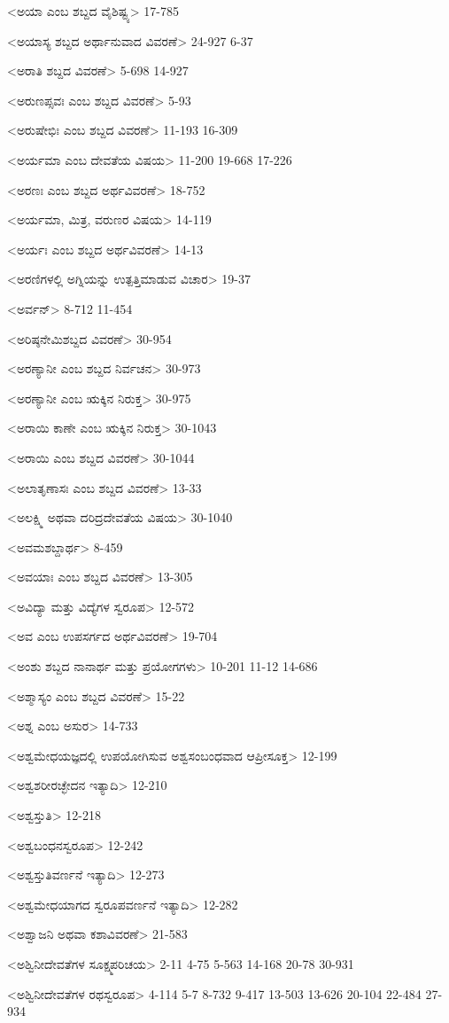 <ಅಯಾ ಎಂಬ ಶಬ್ದದ ವೈಶಿಷ್ಟ್ಯ>
17-785

<ಅಯಾಸ್ಯ ಶಬ್ದದ ಅರ್ಥಾನುವಾದ ವಿವರಣೆ>
24-927
6-37

<ಅರಾತಿ ಶಬ್ದದ ವಿವರಣೆ>
5-698
14-927

<ಅರುಣಪ್ಸವಃ ಎಂಬ ಶಬ್ದದ ವಿವರಣೆ>
5-93


<ಅರುಷೇಭಿಃ ಎಂಬ ಶಬ್ದದ ವಿವರಣೆ>
11-193
16-309

<ಅರ್ಯಮಾ ಎಂಬ ದೇವತೆಯ ವಿಷಯ>
11-200 
19-668
17-226

<ಅರಣಃ ಎಂಬ ಶಬ್ದದ ಅರ್ಥವಿವರಣೆ>
18-752

<ಅರ್ಯಮಾ, ಮಿತ್ರ, ವರುಣರ ವಿಷಯ>
14-119

<ಅರ್ಯಃ ಎಂಬ ಶಬ್ದದ ಅರ್ಥವಿವರಣೆ>
14-13

<ಅರಣಿಗಳಲ್ಲಿ ಅಗ್ನಿಯನ್ನು ಉತ್ಪತ್ತಿಮಾಡುವ ವಿಚಾರ>
19-37

<ಅರ್ವನ್‍>
8-712
11-454

<ಅರಿಷ್ಠನೇಮಿಶಬ್ದದ ವಿವರಣೆ>
30-954

<ಅರಣ್ಯಾನೀ ಎಂಬ ಶಬ್ದದ ನಿರ್ವಚನ>
30-973

<ಅರಣ್ಯಾನೀ ಎಂಬ ಋಕ್ಕಿನ ನಿರುಕ್ತ>
30-975

<ಅರಾಯಿ ಕಾಣೇ ಎಂಬ ಋಕ್ಕಿನ ನಿರುಕ್ತ>
30-1043

<ಅರಾಯಿ ಎಂಬ ಶಬ್ದದ ವಿವರಣೆ>
30-1044

<ಅಲಾತೃಣಾಸಃ ಎಂಬ ಶಬ್ದದ ವಿವರಣೆ>
13-33

<ಅಲಕ್ಷ್ಮಿ ಅಥವಾ ದರಿದ್ರದೇವತೆಯ ವಿಷಯ>
30-1040

<ಅವಮಶಬ್ದಾರ್ಥ>
8-459

<ಅವಯಾಃ ಎಂಬ ಶಬ್ದದ ವಿವರಣೆ>
13-305

<ಅವಿದ್ಯಾ ಮತ್ತು ವಿದ್ಯೆಗಳ ಸ್ವರೂಪ>
12-572

<ಅವ ಎಂಬ ಉಪಸರ್ಗದ ಅರ್ಥವಿವರಣೆ>
19-704

<ಅಂಶು ಶಬ್ದದ ನಾನಾರ್ಥ ಮತ್ತು ಪ್ರಯೋಗಗಳು>
10-201 
11-12
14-686

<ಅಶ್ಮಾಸ್ಯಂ ಎಂಬ ಶಬ್ದದ ವಿವರಣೆ>
15-22

<ಅಶ್ನ ಎಂಬ ಅಸುರ>
14-733

<ಅಶ್ವಮೇಧಯಜ್ಞದಲ್ಲಿ ಉಪಯೋಗಿಸುವ ಅಶ್ವಸಂಬಂಧವಾದ ಆಪ್ರೀಸೂಕ್ತ>
12-199

<ಅಶ್ವಶರೀರಚ್ಛೇದನ ಇತ್ಯಾದಿ>
12-210

<ಅಶ್ವಸ್ತುತಿ>
12-218

<ಅಶ್ವಬಂಧನಸ್ವರೂಪ>
12-242

<ಅಶ್ವಸ್ತುತಿವರ್ಣನೆ ಇತ್ಯಾದಿ>
12-273

<ಅಶ್ವಮೇಧಯಾಗದ ಸ್ವರೂಪವರ್ಣನೆ ಇತ್ಯಾದಿ>
12-282

<ಅಶ್ವಾಜನಿ ಅಥವಾ ಕಶಾವಿವರಣೆ>
21-583

<ಅಶ್ವಿನೀದೇವತೆಗಳ ಸೂಕ್ಷ್ಮಪರಿಚಯ>
2-11 
4-75 
5-563 
14-168 
20-78
30-931

<ಅಶ್ವಿನೀದೇವತೆಗಳ ರಥಸ್ವರೂಪ>
4-114
5-7 
8-732 
9-417 
13-503 
13-626 
20-104 
22-484 
27-934

